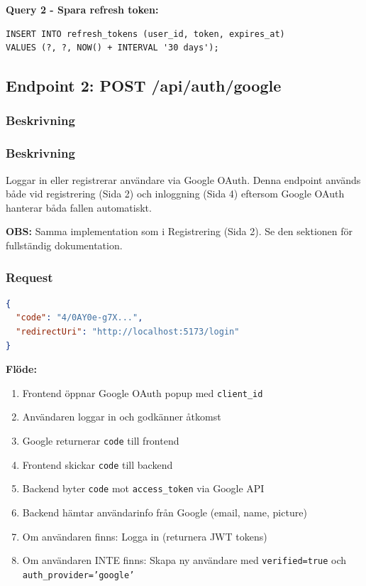 \documentclass[12pt,a4paper]{article}
\begin{document}
\textbf{Query 2 - Spara refresh token:}
\begin{verbatim}
INSERT INTO refresh_tokens (user_id, token, expires_at) 
VALUES (?, ?, NOW() + INTERVAL '30 days');
\end{verbatim}

\subsection{Endpoint 2: POST /api/auth/google}

\subsubsection{Beskrivning} \subsubsection{Beskrivning}
Loggar in eller registrerar användare via Google OAuth. Denna endpoint används både vid registrering (Sida 2) och inloggning (Sida 4) eftersom Google OAuth hanterar båda fallen automatiskt.

\textbf{OBS:} Samma implementation som i Registrering (Sida 2). Se den sektionen för fullständig dokumentation.

\subsubsection{Request}
\begin{lstlisting}[language=json]
{
  "code": "4/0AY0e-g7X...",
  "redirectUri": "http://localhost:5173/login"
}
\end{lstlisting}

\textbf{Flöde:}
\begin{enumerate}[noitemsep]
  \item Frontend öppnar Google OAuth popup med \texttt{client\_id}
  \item Användaren loggar in och godkänner åtkomst
  \item Google returnerar \texttt{code} till frontend
  \item Frontend skickar \texttt{code} till backend
  \item Backend byter \texttt{code} mot \texttt{access\_token} via Google API
  \item Backend hämtar användarinfo från Google (email, name, picture)
  \item Om användaren finns: Logga in (returnera JWT tokens)
  \item Om användaren INTE finns: Skapa ny användare med \texttt{verified=true} och \texttt{auth\_provider='google'}
\end{enumerate}
\end{document}
